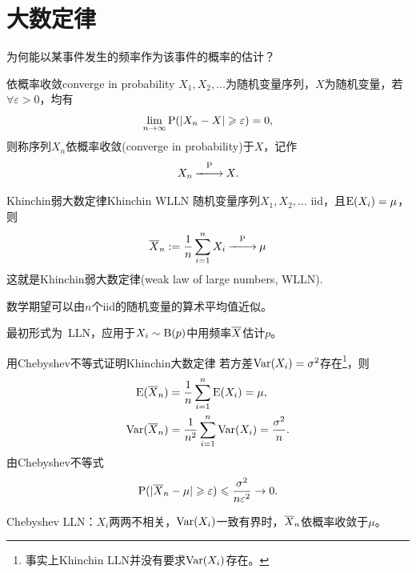 \section{大数定律}
为何能以某事件发生的频率作为该事件的概率的估计？
\begin{definition}{依概率收敛}{converge in probability}
	$X_1,X_2,\ldots$为随机变量序列，$X$为随机变量，若$\forall\varepsilon>0$，均有
	\[
		\lim_{n\to\infty}\P(|X_n-X|\geqslant\varepsilon)=0,
	\]
	则称序列$X_n$依概率收敛(converge in probability)于$X$，记作
	\begin{equation}
		X_n\pto X.
	\end{equation}
\end{definition}
\begin{theorem}{Khinchin弱大数定律}{Khinchin WLLN}
	随机变量序列$X_1,X_2,\ldots$ iid，且$\E(X_i)=\mu$，则
	\begin{equation}
		\avg X_n:=\frac1n\sum_{i=1}^nX_i\pto\mu
	\end{equation}
	这就是Khinchin弱大数定律(weak law of large numbers, WLLN).
\end{theorem}

\begin{corollary}
	数学期望可以由$n$个iid的随机变量的算术平均值近似。
\end{corollary}

\begin{remark}
	最初形式为\Bern\ LLN，应用于$X_i\sim\Bino(p)$中用频率$\avg X$估计$p$。
\end{remark}

\begin{example}{用Chebyshev不等式证明Khinchin大数定律}{}
	若方差$\Var(X_i)=\sigma^2$存在\footnote{事实上Khinchin LLN并没有要求$\Var(X_i)$存在。}，则
	\begin{subequations}
		\begin{align}
			\E(\avg X_n)&=\frac1n\sum_{i=1}^n\E(X_i)=\mu,\\
			\Var(\avg X_n)&=\frac1{n^2}\sum_{i=1}^n\Var(X_i)=\frac{\sigma^2}n.
		\end{align}
	\end{subequations}
	由Chebyshev不等式
	\[
		\P(|\avg X_n-\mu|\geqslant\varepsilon)\leqslant\frac{\sigma^2}{n\varepsilon^2}\to 0.
	\]
\end{example}

\begin{remark}
	Chebyshev LLN：$X_i$两两不相关，$\Var(X_i)$一致有界时，$\avg X_n$依概率收敛于$\mu$。
\end{remark}

